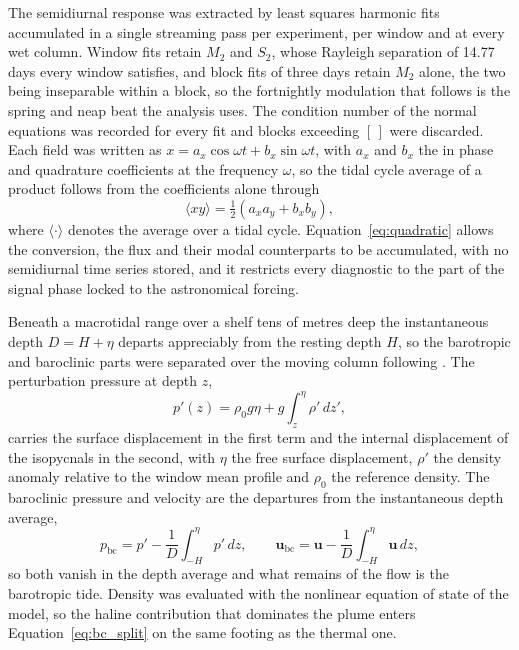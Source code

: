 \documentclass[a4paper,fleqn]{cas-sc}
\newcommand{\bc}{\mathrm{bc}}
\begin{document}
The semidiurnal response was extracted by least squares harmonic fits accumulated in a single streaming pass per experiment, per window and at every wet column. Window fits retain $M_{2}$ and $S_{2}$, whose Rayleigh separation of 14.77 days every window satisfies, and block fits of three days retain $M_{2}$ alone, the two being inseparable within a block, so the fortnightly modulation that follows is the spring and neap beat the analysis uses. The condition number of the normal equations was recorded for every fit and blocks exceeding $[\,]$ were discarded. Each field was written as $x=a_{x}\cos\omega t+b_{x}\sin\omega t$, with $a_{x}$ and $b_{x}$ the in phase and quadrature coefficients at the frequency $\omega$, so the tidal cycle average of a product follows from the coefficients alone through
\begin{equation}
\langle xy\rangle=\tfrac{1}{2}\left(a_{x}a_{y}+b_{x}b_{y}\right) ,
\label{eq:quadratic}
\end{equation}
where $\langle\cdot\rangle$ denotes the average over a tidal cycle. Equation~\ref{eq:quadratic} allows the conversion, the flux and their modal counterparts to be accumulated, with no semidiurnal time series stored, and it restricts every diagnostic to the part of the signal phase locked to the astronomical forcing.

Beneath a macrotidal range over a shelf tens of metres deep the instantaneous depth $D=H+\eta$ departs appreciably from the resting depth $H$, so the barotropic and baroclinic parts were separated over the moving column following \citet{kelly:2010}. The perturbation pressure at depth $z$,
\begin{equation}
p'(z)=\rho_{0}g\eta+g\int_{z}^{\eta}\rho'\,dz' ,
\label{eq:pressure}
\end{equation}
carries the surface displacement in the first term and the internal displacement of the isopycnals in the second, with $\eta$ the free surface displacement, $\rho'$ the density anomaly relative to the window mean profile and $\rho_{0}$ the reference density. The baroclinic pressure and velocity are the departures from the instantaneous depth average,
\begin{equation}
p_{\bc}=p'-\frac{1}{D}\int_{-H}^{\eta}p'\,dz ,
\qquad
\mathbf{u}_{\bc}=\mathbf{u}-\frac{1}{D}\int_{-H}^{\eta}\mathbf{u}\,dz ,
\label{eq:bc_split}
\end{equation}
so both vanish in the depth average and what remains of the flow is the barotropic tide. Density was evaluated with the nonlinear equation of state of the model, so the haline contribution that dominates the plume enters Equation~\ref{eq:bc_split} on the same footing as the thermal one.
\end{document}
